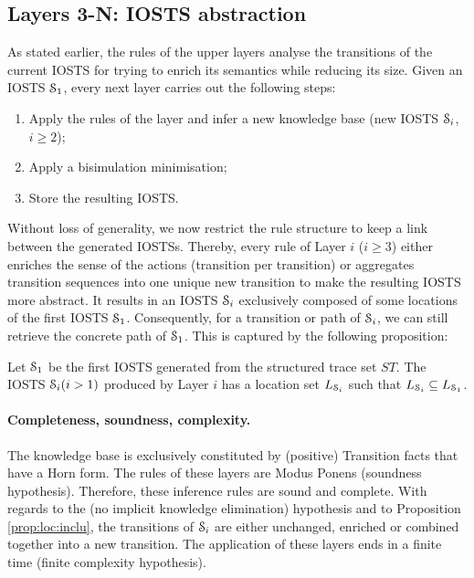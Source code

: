 \subsection{Layers 3-N: IOSTS abstraction}
\label{sec:modelinf:webapps:L4}

As stated earlier, the rules of the upper layers analyse the
transitions of the current IOSTS for trying to enrich its
semantics while reducing its size. Given an IOSTS
$\EuScript{S}_1$, every next layer carries out the following
steps:

\begin{enumerate}
\item Apply the rules of the layer and infer a new knowledge base
(new IOSTS $\EuScript{S}_i$, $i\geq 2$);

\item Apply a bisimulation minimisation;

\item Store the resulting IOSTS.
\end{enumerate}

Without loss of generality, we now restrict the rule structure to
keep a link between the generated IOSTSs. Thereby, every rule of
Layer $i$ ($i \geq 3$) either enriches the sense of the actions
(transition per transition) or aggregates transition sequences
into one unique new transition to make the resulting IOSTS more
abstract. It results in an IOSTS $\EuScript{S}_i$ exclusively
composed of some locations of the first IOSTS $\EuScript{S}_1$.
Consequently, for a transition or path of $\EuScript{S}_i$, we
can still retrieve the concrete path of $\EuScript{S}_1$. This is
captured by the following proposition:

\begin{proposition}
\label{prop:loc:inclu}
Let $\EuScript{S}_1$ be the first IOSTS generated from the
structured trace set $ST$. The IOSTS $\EuScript{S}_i (i>1)$
produced by Layer $i$ has a location set $L_{\EuScript{S}_i}$
such that $L_{\EuScript{S}_i} \subseteq L_{\EuScript{S}_1}$.
\end{proposition}

\paragraph{Completeness, soundness, complexity.}

The knowledge base is exclusively constituted by (positive)
Transition facts that have a Horn form. The rules of these layers
are Modus Ponens (soundness hypothesis). Therefore, these
inference rules are sound and complete. With regards to the (no
implicit knowledge elimination) hypothesis and to Proposition
\ref{prop:loc:inclu}, the transitions of $\EuScript{S}_i$ are
either unchanged, enriched or combined together into a new
transition. The application of these layers ends in a finite time
(finite complexity hypothesis).

